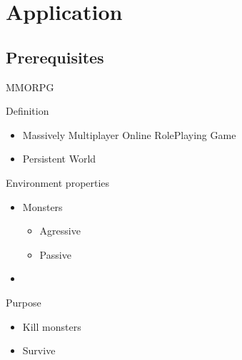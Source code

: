 \section{Application}

\subsection{Prerequisites}

\begin{frame}{MMORPG}
  \begin{block}{Definition}
    \begin{itemize}
    \item Massively Multiplayer Online RolePlaying Game
    \item Persistent World
    \end{itemize}
  \end{block}

  \begin{block}{Environment properties}
    \begin{itemize}
    \item Monsters
      \begin{itemize}
      \item Agressive
      \item Passive
      \end{itemize}
    \item

    \end{itemize}
  \end{block}

  \begin{block}{Purpose}
    \begin{itemize}
    \item Kill monsters
    \item Survive
    \end{itemize}
  \end{block}
\end{frame}

